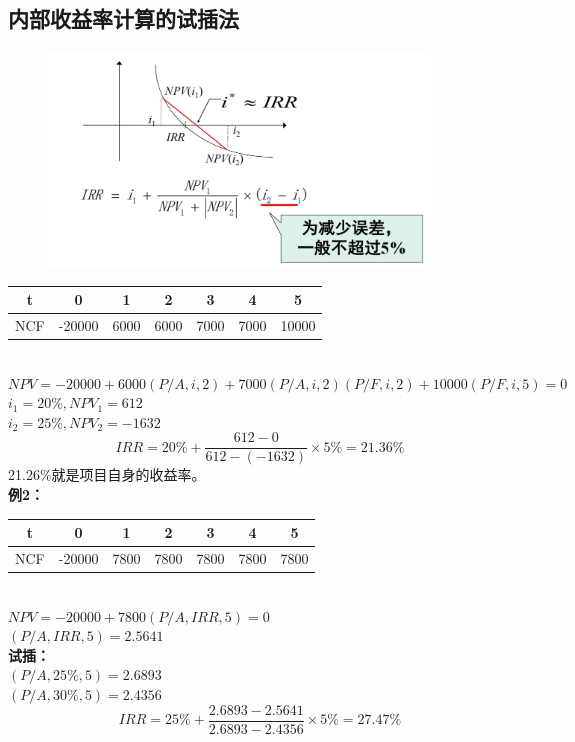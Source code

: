 \subsection{内部收益率计算的试插法}
\begin{figure}[H]
    \centering
    \includegraphics[width=0.9\textwidth]{image/试算内插法.png}
    \label{fig:18}
\end{figure}

\begin{table}[H]
\centering
\begin{tabular}{|c|c|c|c|c|c|c|}
\hline
t   & 0 & 1 & 2 & 3 & 4  & 5  \\ \hline
NCF   & -20000 & 6000  & 6000  & 7000  & 7000  & 10000   \\ \hline
\end{tabular}
\end{table}
\\
$NPV = −20000 + 6000(P/ A,i,2) + 7000(P/ A,i,2)(P/ F,i,2) +10000(P/ F,i,5) = 0$\\
$i_1=20\%, NPV_1=612$\\ 
$i_2=25\%, NPV_2=-1632$
$$IRR=20\%+\frac{612-0}{612-(-1632)} \times 5\%=21.36\%$$
21.26\%就是项目自身的收益率。\\
\textbf{例2：}
\begin{table}[H]
\centering
\begin{tabular}{|c|c|c|c|c|c|c|}
\hline
t   & 0 & 1 & 2 & 3 & 4  & 5  \\ \hline
NCF   & -20000 & 7800  & 7800  & 7800  & 7800  & 7800   \\ \hline
\end{tabular}
\end{table}
\\
$NPV = −20000 + 7800(P/ A,IRR,5) = 0$\\
$(P/A,IRR,5) = 2.5641$\\
\textbf{试插：}\\
$(P/A,25\%,5)=2.6893$\\
$(P/A,30\%,5)=2.4356$
$$IRR=25\%+\frac{2.6893-2.5641}{2.6893-2.4356} \times 5\% =27.47\%$$

